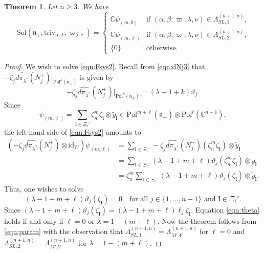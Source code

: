 \documentclass[reqno,11pt]{amsart}
\newtheorem{thm}[equation]{Theorem}
\theoremstyle{remark}
\theoremstyle{definition}
\numberwithin{equation}{section}
\newcommand{\gL}{\Lambda}
\newcommand{\fn}{{\mathfrak n}}
\newcommand{\C}{\mathbb{C}}
\newcommand{\Sol}{\mathrm{Sol}}
\newcommand{\Pol}{\mathrm{Pol}}
\newcommand{\triv}{\mathrm{triv}}
\newcommand{\dpi}{d\pi}
\newcommand{\id}{\mathrm{id}}
\begin{document}
\begin{thm}\label{thm:Sol1}
Let $n\geq 3$. We have 
\begin{equation*}
\Sol(\fn_+; \triv_{\alpha, \lambda}, \varpi_{\beta, \nu})
=
\begin{cases}
\C\psi_{(m,0)} 
& \text{if $(\alpha, \beta;\varpi; \lambda, \nu)\in \Lambda^{(n+1,n)}_{SL,1}$,}\\[3pt]
\C \psi_{(m,\ell)} 
& \text{if $(\alpha, \beta;\varpi; \lambda, \nu)\in \Lambda^{(n+1,n)}_{SL,2}$,}\\
\{0\} & \text{otherwise.}
\end{cases}
\end{equation*}

\end{thm}

\begin{proof}
We wish to solve \eqref{eqn:Fsys2}.
Recall from \eqref{eqn:dNj3} that
$-\zeta_j\widehat{\dpi_{\lambda^*}}(N_j^+)\vert_{\Pol^k(\fn_+)}$ is given by
\begin{equation*}
-\zeta_j\widehat{\dpi_{\lambda^*}}(N_j^+)\vert_{\Pol^k(\fn_+)}
=(\lambda-1+k)\vartheta_j.
\end{equation*}
Since 
\begin{equation*}
\psi_{(m,\ell)} =
\sum_{\mathbf{l}\in \Xi_\ell'}
\zeta_n^m\zeta_{\mathbf{l}} \otimes \widetilde{y}_{\mathbf{l}}
\in \Pol^{m+\ell}(\fn_+) \otimes \Pol^\ell(\C^{n-1}),
\end{equation*}
the left-hand side of \eqref{eqn:Fsys2} amounts to
\begin{align*}
(-\zeta_j\widehat{\dpi_{\lambda^*}}(N_j^+)\otimes \id_W)\psi_{(m,\ell)} 
&=
\sum_{\mathbf{l}\in \Xi_\ell'}
-\zeta_j\widehat{\dpi_{\lambda^*}}(N_j^+)(\zeta_n^m\zeta_{\mathbf{l}})
\otimes \widetilde{y}_{\mathbf{l}}\\
&=
\sum_{\mathbf{l}\in \Xi_\ell'}
(\lambda-1+m+\ell)\vartheta_j(\zeta_n^m\zeta_{\mathbf{l}})
\otimes \widetilde{y}_{\mathbf{l}}\\
&=
\zeta_n^m 
\sum_{\mathbf{l}\in \Xi_\ell'}
(\lambda-1+m+\ell)\vartheta_j(\zeta_{\mathbf{l}})
\otimes \widetilde{y}_{\mathbf{l}}.
\end{align*}
Thus, one wishes to solve
\begin{equation}\label{eqn:theta}
(\lambda-1+m+\ell)\vartheta_j(\zeta_{\mathbf{l}}) =0
\quad
\text{for all $j \in \{1,\ldots, n-1\}$ and $\mathbf{l} \in \Xi_\ell'$}.
\end{equation}
Since
$(\lambda-1+m+\ell)\vartheta_j(\zeta_{\mathbf{l}}) 
=(\lambda-1+m+\ell)\ell_j\zeta_{\mathbf{l}}$,
Equation
\eqref{eqn:theta} holds if and only if $\ell=0$ or $\lambda = 1-(m+\ell)$.
Now the theorem follows from \eqref{eqn:param}
with the observation that
$\gL^{(n+1,n)}_{SL,1}=\gL^{(n+1,n)}_{M'A'}$ for $\ell =0$ and 
$\gL^{(n+1,n)}_{SL,2}=\gL^{(n+1,n)}_{M'A'}$ for $\lambda = 1-(m+\ell)$.

\end{proof}
\end{document}
